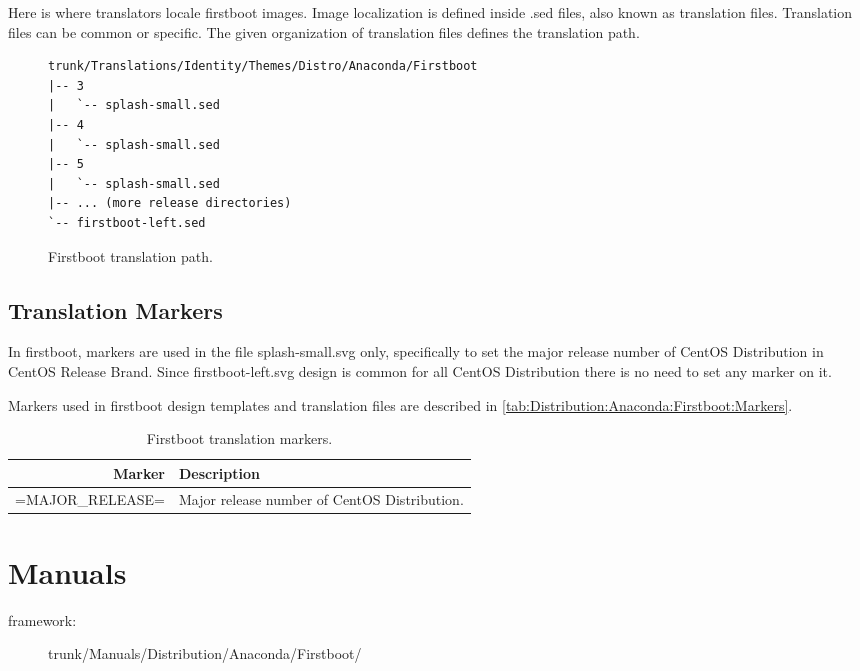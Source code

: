 \noindent Here is where translators locale firstboot images. Image
localization is defined inside .sed files, also known as translation
files.  Translation files can be common or specific. The given
organization of translation files defines the translation path.

\begin{figure}[!hbp]
\hrulefill
\begin{verbatim}
trunk/Translations/Identity/Themes/Distro/Anaconda/Firstboot
|-- 3
|   `-- splash-small.sed
|-- 4
|   `-- splash-small.sed
|-- 5
|   `-- splash-small.sed
|-- ... (more release directories)
`-- firstboot-left.sed
\end{verbatim}
\hrulefill
\caption{Firstboot translation path.%
   \label{fig:Distribution:Anaconda:Firstboot:Translations}}
\end{figure}

\subsection{Translation Markers}

In firstboot, markers are used in the file splash-small.svg only,
specifically to set the major release number of CentOS Distribution in
CentOS Release Brand. Since firstboot-left.svg design is common for
all CentOS Distribution there is no need to set any marker on it.

Markers used in firstboot design templates and translation files are
described in \autoref{tab:Distribution:Anaconda:Firstboot:Markers}.

\begin{table}
\centering
\begin{tabular}{rl}
\hline
\textbf{Marker} & \textbf{Description}\\
\hline
=MAJOR\_RELEASE= & Major release number of CentOS Distribution.\\
\hline
\end{tabular}
\caption{Firstboot translation markers.%
   \label{tab:Distribution:Anaconda:Firstboot:Markers}}
\end{table}

\section{Manuals}
\hypertarget{sec:Distribution:Anaconda:Firstboot:Manuals}{}
\label{sec:Distribution:Anaconda:Firstboot:Manuals}

\begin{description}
\item[framework:]
trunk/Manuals/Distribution/Anaconda/Firstboot/
\end{description}


